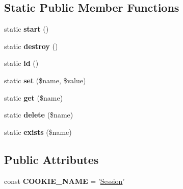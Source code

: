 \subsection*{Static Public Member Functions}
\begin{DoxyCompactItemize}
\item 
\hypertarget{classSession_ac7df4ddf4ca4f3eaa2cad24dd4c25f0d}{
static {\bfseries start} ()}
\label{classSession_ac7df4ddf4ca4f3eaa2cad24dd4c25f0d}

\item 
\hypertarget{classSession_a5dde74b6fa44649e5b73cb1096930dd4}{
static {\bfseries destroy} ()}
\label{classSession_a5dde74b6fa44649e5b73cb1096930dd4}

\item 
\hypertarget{classSession_a1d530d9cd2d5fbb4d69a82c40971bee8}{
static {\bfseries id} ()}
\label{classSession_a1d530d9cd2d5fbb4d69a82c40971bee8}

\item 
\hypertarget{classSession_a06b5c83aa922885acd73206eab682ad0}{
static {\bfseries set} (\$name, \$value)}
\label{classSession_a06b5c83aa922885acd73206eab682ad0}

\item 
\hypertarget{classSession_a3ab93001efaf4399c6b2a576c0901454}{
static {\bfseries get} (\$name)}
\label{classSession_a3ab93001efaf4399c6b2a576c0901454}

\item 
\hypertarget{classSession_a65494672eb7440e6d1ae78e9b43f2e07}{
static {\bfseries delete} (\$name)}
\label{classSession_a65494672eb7440e6d1ae78e9b43f2e07}

\item 
\hypertarget{classSession_ad3ac7fbfbb15f1346dc6e3032a7f6e26}{
static {\bfseries exists} (\$name)}
\label{classSession_ad3ac7fbfbb15f1346dc6e3032a7f6e26}

\end{DoxyCompactItemize}
\subsection*{Public Attributes}
\begin{DoxyCompactItemize}
\item 
\hypertarget{classSession_aeccd30d2f052e1423c6bf3c6ac67c0ca}{
const {\bfseries COOKIE\_\-NAME} = '\hyperlink{classSession}{Session}'}
\label{classSession_aeccd30d2f052e1423c6bf3c6ac67c0ca}

\end{DoxyCompactItemize}
